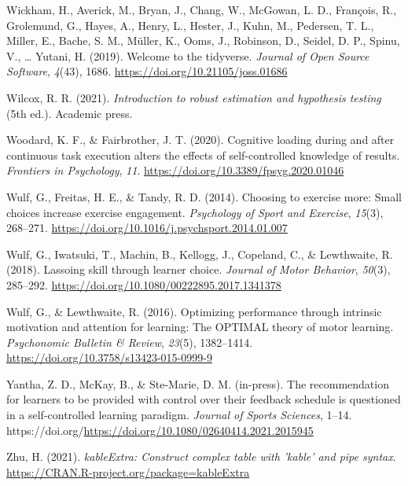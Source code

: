 \documentclass[
  doc, donotrepeattitle,floatsintext]{apa7}
\newlength{\cslhangindent}
\newlength{\cslentryspacingunit} %
\newenvironment{CSLReferences}[2] %
 {%
  \setlength{\parindent}{0pt}
  \ifodd #1
  \let\oldpar\par
  \def\par{\hangindent=\cslhangindent\oldpar}
  \fi
  \setlength{\parskip}{#2\cslentryspacingunit}
 }%
 {}
\begin{document}
\begin{CSLReferences}{1}{0}
\leavevmode{}%
Wickham, H., Averick, M., Bryan, J., Chang, W., McGowan, L. D., François, R., Grolemund, G., Hayes, A., Henry, L., Hester, J., Kuhn, M., Pedersen, T. L., Miller, E., Bache, S. M., Müller, K., Ooms, J., Robinson, D., Seidel, D. P., Spinu, V., \ldots{} Yutani, H. (2019). Welcome to the {tidyverse}. \emph{Journal of Open Source Software}, \emph{4}(43), 1686. \url{https://doi.org/10.21105/joss.01686}

\leavevmode{}%
Wilcox, R. R. (2021). \emph{Introduction to robust estimation and hypothesis testing} (5th ed.). Academic press.

\leavevmode{}%
Woodard, K. F., \& Fairbrother, J. T. (2020). Cognitive loading during and after continuous task execution alters the effects of self-controlled knowledge of results. \emph{Frontiers in Psychology}, \emph{11}. \url{https://doi.org/10.3389/fpsyg.2020.01046}

\leavevmode{}%
Wulf, G., Freitas, H. E., \& Tandy, R. D. (2014). Choosing to exercise more: {Small} choices increase exercise engagement. \emph{Psychology of Sport and Exercise}, \emph{15}(3), 268--271. \url{https://doi.org/10.1016/j.psychsport.2014.01.007}

\leavevmode{}%
Wulf, G., Iwatsuki, T., Machin, B., Kellogg, J., Copeland, C., \& Lewthwaite, R. (2018). Lassoing skill through learner choice. \emph{Journal of Motor Behavior}, \emph{50}(3), 285--292. \url{https://doi.org/10.1080/00222895.2017.1341378}

\leavevmode{}%
Wulf, G., \& Lewthwaite, R. (2016). Optimizing performance through intrinsic motivation and attention for learning: {The} {OPTIMAL} theory of motor learning. \emph{Psychonomic Bulletin \& Review}, \emph{23}(5), 1382--1414. \url{https://doi.org/10.3758/s13423-015-0999-9}

\leavevmode{}%
Yantha, Z. D., McKay, B., \& Ste-Marie, D. M. (in-press). The recommendation for learners to be provided with control over their feedback schedule is questioned in a self-controlled learning paradigm. \emph{Journal of Sports Sciences}, 1--14. https://doi.org/\url{https://doi.org/10.1080/02640414.2021.2015945}

\leavevmode{}%
Zhu, H. (2021). \emph{kableExtra: Construct complex table with 'kable' and pipe syntax}. \url{https://CRAN.R-project.org/package=kableExtra}

\end{CSLReferences}
\end{document}
